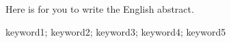 
\eabstract
{
Here is for you to write the English abstract.



}
{keyword1; keyword2; keyword3; keyword4; keyword5}	%